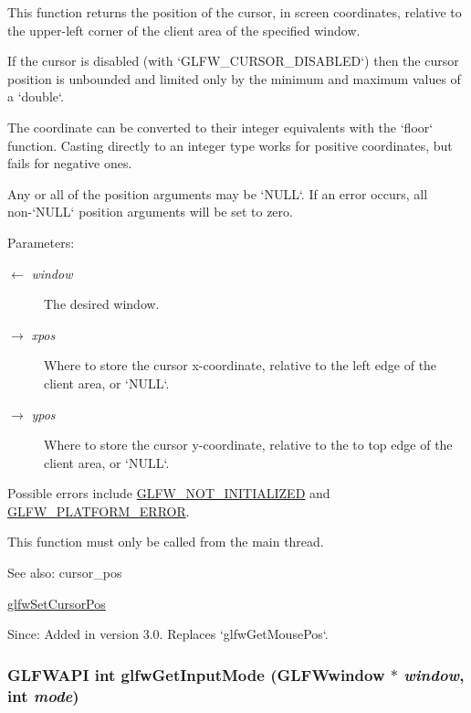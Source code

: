 This function returns the position of the cursor, in screen coordinates, relative to the upper-left corner of the client area of the specified window.

If the cursor is disabled (with `GLFW\_\-CURSOR\_\-DISABLED`) then the cursor position is unbounded and limited only by the minimum and maximum values of a `double`.

The coordinate can be converted to their integer equivalents with the `floor` function. Casting directly to an integer type works for positive coordinates, but fails for negative ones.

Any or all of the position arguments may be `NULL`. If an error occurs, all non-`NULL` position arguments will be set to zero.

\begin{Desc}
\item[Parameters:]
\begin{description}
\item[\mbox{$\leftarrow$} {\em window}]The desired window. \item[\mbox{$\rightarrow$} {\em xpos}]Where to store the cursor x-coordinate, relative to the left edge of the client area, or `NULL`. \item[\mbox{$\rightarrow$} {\em ypos}]Where to store the cursor y-coordinate, relative to the to top edge of the client area, or `NULL`.\end{description}
\end{Desc}
Possible errors include \hyperlink{group__errors_g2374ee02c177f12e1fa76ff3ed15e14a}{GLFW\_\-NOT\_\-INITIALIZED} and \hyperlink{group__errors_gd44162d78100ea5e87cdd38426b8c7a1}{GLFW\_\-PLATFORM\_\-ERROR}.

This function must only be called from the main thread.

\begin{Desc}
\item[See also:]cursor\_\-pos 

\hyperlink{group__input_gaf152cc93418acb0ba342e3f4af922bc}{glfwSetCursorPos}\end{Desc}
\begin{Desc}
\item[Since:]Added in version 3.0. Replaces `glfwGetMousePos`. \end{Desc}
\hypertarget{group__input_g1248dd5b1e566b2817e71547564d6af9}{
\subsubsection[glfwGetInputMode]{\setlength{\rightskip}{0pt plus 5cm}GLFWAPI int glfwGetInputMode ({\bf GLFWwindow} $\ast$ {\em window}, \/  int {\em mode})}}
\label{group__input_g1248dd5b1e566b2817e71547564d6af9}



